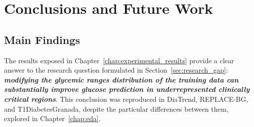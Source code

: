 \chapter{Conclusions and Future Work}

\section{Main Findings}
\label{sec:main_findings}

The results exposed in Chapter~\ref{chap:experimental_results} provide a clear answer to the research question formulated in Section~\ref{sec:research_gap}:\textbf{\textit{ modifying the glycemic ranges distribution of the training data can substantially improve glucose prediction in underrepresented clinically critical regions}}. This conclusion was reproduced in DiaTrend, REPLACE-BG, and T1DiabetesGranada, despite the particular differences between them, explored in Chapter~\ref{chap:eda}.

